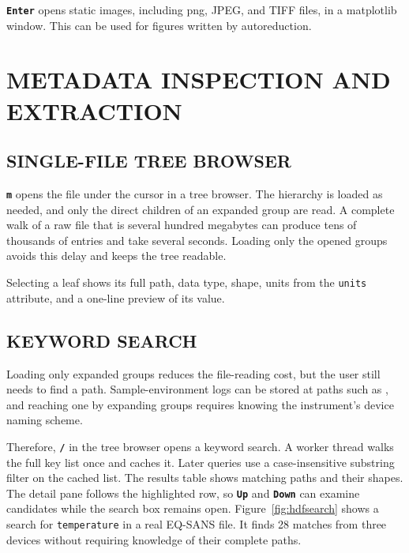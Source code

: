 \documentclass[tm]{ornltm}
\newcommand{\key}[1]{\textbf{\texttt{#1}}}
\begin{document}
\key{Enter} opens static images, including \ac{png}, JPEG, and TIFF files, in a
matplotlib window. This can be used for figures written by autoreduction.

\section{METADATA INSPECTION AND EXTRACTION}
\label{sec:meta}

\subsection{SINGLE-FILE TREE BROWSER}

\key{m} opens the file under the cursor in a tree browser. The hierarchy is
loaded as needed, and only the direct children of an expanded group are read.
A complete walk of a raw file that is several hundred megabytes can produce tens
of thousands of entries and take several seconds. Loading only the opened groups
avoids this delay and keeps the tree readable.

Selecting a leaf shows its full path, data type, shape, units from the
\texttt{units} attribute, and a one-line preview of its value.

\subsection{KEYWORD SEARCH}
\label{sec:hdfsearch}

Loading only expanded groups reduces the file-reading cost, but the user still
needs to find a path. Sample-environment logs can be stored at paths such as
, and reaching one by
expanding groups requires knowing the instrument's device naming scheme.

Therefore, \key{/} in the tree browser opens a keyword search. A worker thread
walks the full key list once and caches it. Later queries use a case-insensitive
substring filter on the cached list. The results table shows matching paths and
their shapes. The detail pane follows the highlighted row, so \key{Up} and
\key{Down} can examine candidates while the search box remains open.
Figure~\ref{fig:hdfsearch} shows a search for \texttt{temperature} in a real
EQ-SANS file. It finds 28 matches from three devices without requiring knowledge
of their complete paths.
\end{document}
